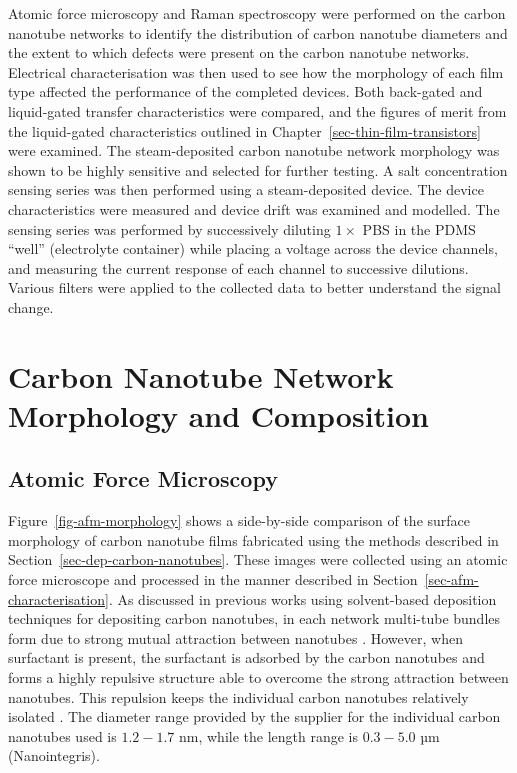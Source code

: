 \documentclass[
  a4paper,
]{scrbook}
\begin{document}
Atomic force microscopy and Raman spectroscopy were performed on the
carbon nanotube networks to identify the distribution of carbon nanotube
diameters and the extent to which defects were present on the carbon
nanotube networks. Electrical characterisation was then used to see how
the morphology of each film type affected the performance of the
completed devices. Both back-gated and liquid-gated transfer
characteristics were compared, and the figures of merit from the
liquid-gated characteristics outlined in
Chapter~\ref{sec-thin-film-transistors} were examined. The
steam-deposited carbon nanotube network morphology was shown to be
highly sensitive and selected for further testing. A salt concentration
sensing series was then performed using a steam-deposited device. The
device characteristics were measured and device drift was examined and
modelled. The sensing series was performed by successively diluting
\(1 \times\) PBS in the PDMS ``well'' (electrolyte container) while
placing a voltage across the device channels, and measuring the current
response of each channel to successive dilutions. Various filters were
applied to the collected data to better understand the signal change.

\hypertarget{sec-pristine-morphology}{%
\section{Carbon Nanotube Network Morphology and
Composition}\label{sec-pristine-morphology}}

\hypertarget{sec-pristine-AFM}{%
\subsection{Atomic Force Microscopy}\label{sec-pristine-AFM}}

Figure~\ref{fig-afm-morphology} shows a side-by-side comparison of the
surface morphology of carbon nanotube films fabricated using the methods
described in Section~\ref{sec-dep-carbon-nanotubes}. These images were
collected using an atomic force microscope and processed in the manner
described in Section~\ref{sec-afm-characterisation}. As discussed in
previous works using solvent-based deposition techniques for depositing
carbon nanotubes, in each network multi-tube bundles form due to strong
mutual attraction between nanotubes
\autocite{Zheng2017,Murugathas2018,Murugathas2019,Nguyen2021}. However,
when surfactant is present, the surfactant is adsorbed by the carbon
nanotubes and forms a highly repulsive structure able to overcome the
strong attraction between nanotubes. This repulsion keeps the individual
carbon nanotubes relatively isolated
\autocite{Wenseleers2004,Gavrel2013,Hermanson2013-16,Shimizu2013,DiCrescenzo2014,Yang2023}.
The diameter range provided by the supplier for the individual carbon
nanotubes used is \(1.2-1.7\) nm, while the length range is \(0.3-5.0\)
µm (Nanointegris).
\end{document}
